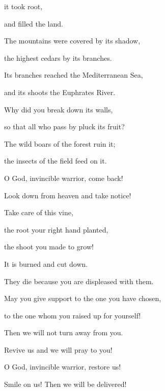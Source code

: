 {\par }{\Q it took
root,
\par }{\Q and filled
the land.
\par }{\Q {}The mountains
were covered
by its shadow,
\par }{\Q the highest
cedars
by its branches.
\par }{\Q {}Its branches
reached
the Mediterranean
Sea,
\par }{\Q and its shoots
the Euphrates River.
\par }{\Q {}Why
did you break down
its walls,
\par }{\Q so that all
who pass by
pluck its fruit?
\par }{\Q {}The wild boars
of the forest
ruin it;

\par }{\Q the insects
of the field
feed on it.
\par }{\Q {}O God,
invincible
warrior, come back!
\par }{\Q Look
down from heaven
and take notice!
\par }{\Q Take care
of this
vine,
\par }{\Q {}the root
your right hand
planted,
\par }{\Q the shoot
you made to grow!
\par }{\Q {}It is burned
and cut down.
\par }{\Q They die
because you are displeased with them.
\par }{\Q {}May
you give support
to the one
you have chosen,
\par }{\Q to the one
whom you raised up for yourself!
\par }{\Q {}Then we will not
turn away
from
you.
\par }{\Q Revive
us and we will pray
to you!
\par }{\Q {}O
{}
God,
invincible
warrior, restore
us!
\par }{\Q Smile
on us! Then we will be delivered!


}
